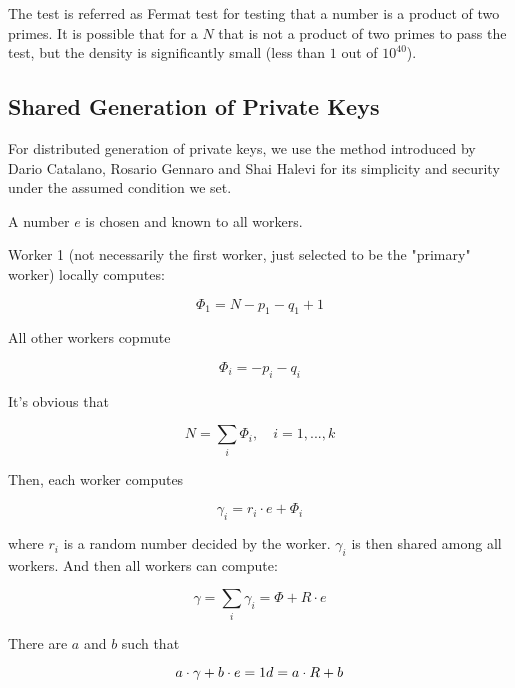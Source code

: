 The test is referred as Fermat test for testing that a number is a product of two primes. It is possible that for a $N$ that is not a product of two primes to pass the test, but the density is significantly small (less than $1$ out of $10^{40}$).

\subsection{Shared Generation of Private Keys}

For distributed generation of private keys, we use the method introduced by Dario Catalano, Rosario Gennaro and Shai Halevi for its simplicity and security under the
assumed condition we set.

A number $e$ is chosen and known to all workers.

Worker 1 (not necessarily the first worker, just selected to be the "primary" worker) locally computes:

\begin{equation}
  \Phi_1 = N - p_1 - q_1 + 1
\end{equation}

All other workers copmute

\begin{equation}
  \Phi_i = - p_i - q_i
\end{equation}

It's obvious that

\begin{equation}
  N = \sum_i \Phi_i, \quad i = 1, ..., k
\end{equation}

Then, each worker computes

\begin{equation}
  \gamma_i = r_i \cdot e + \Phi_i
\end{equation}

where $r_i$ is a random number decided by the worker. $\gamma_i$ is then shared among all workers. And then all workers can compute:

\begin{equation}
  \gamma = \sum_i \gamma_i = \Phi + R \cdot e
\end{equation}

There are $a$ and $b$ such that

\begin{equation}
  a \cdot \gamma + b \cdot e = 1 \\
  d = a \cdot R + b
\end{equation}

